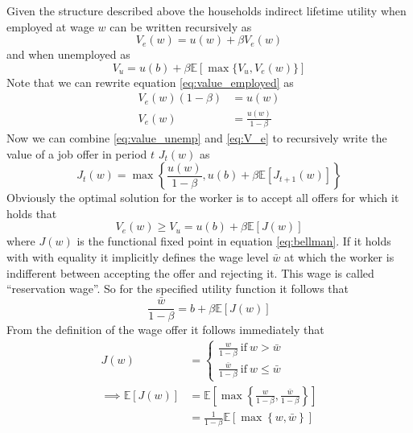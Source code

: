 Given the structure described above the households indirect lifetime utility
when employed at wage $w$ can be written recursively as
\begin{equation}
  \label{eq:value_employed}
  V_e(w) = u(w) + \beta V_e(w)
\end{equation}
and when unemployed as
\begin{equation}
  \label{eq:value_unemp}
  V_u = u(b) + \beta \mathbb{E} \left[\max \{V_u, V_e(w)\} \right]
\end{equation}
Note that we can rewrite equation \eqref{eq:value_employed} as 
\begin{align}
\label{eq:V_e}
  V_e(w) (1 - \beta) &= u(w) \nonumber\\ 
  V_e(w) &= \frac{u(w)}{1 - \beta}
\end{align}
Now we can combine \eqref{eq:value_unemp} and \eqref{eq:V_e} to recursively
write the value of a job offer in period $t$ $J_t(w)$ as
\begin{equation}
\label{eq:bellman}
  J_{t}(w) = \max \left\{ \frac{u(w)}{1 - \beta}, u(b) + \beta \mathbb{E}
    \left[J_{t+1}(w)\right] \right\}
\end{equation}
Obviously the optimal solution for the worker is to accept all offers for which
it holds that 
\begin{equation*}
  V_e(w) \geq V_u = u(b) + \beta \mathbb{E} \left[J(w)\right]
\end{equation*}
where $J(w)$ is the functional fixed point in equation \eqref{eq:bellman}. If
it holds with with equality it implicitly defines the wage level $\bar{w}$ at
which the worker is indifferent between accepting the offer and rejecting
it. This wage is called ``reservation wage''. So for the specified utility
function it follows that
\begin{equation}
\label{eq:res_wage}
  \frac{\bar{w}}{1 - \beta} = b + \beta \mathbb{E} \left[J(w)\right]
\end{equation}
From the definition of the wage offer it follows immediately that
\begin{align*}
  J(w) &= 
  \begin{cases}
    \frac{w}{1 - \beta}~ \text{if}~w > \bar{w} \\
    \frac{\bar{w}}{1 - \beta}~\text{if}~w \leq \bar{w}
  \end{cases}\\
  \implies  \mathbb{E} \left[J(w)\right] &= \mathbb{E} \left[ \max \left\{\frac{w}{1 -
  \beta}, \frac{\bar{w}}{1 - \beta}  \right\}\right] \\
  &= \frac{1}{1 - \beta} \mathbb{E} \left[ \max \left\{w, \bar{w} \right\} \right]
\end{align*}
